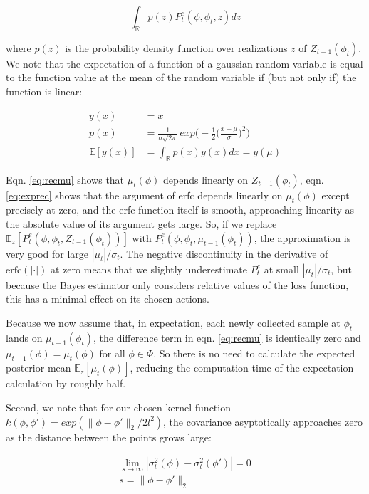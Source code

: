 \documentclass[letterpaper, 10 pt, conference]{ieeeconf}
\begin{document}
\begin{equation}
    \int_\mathbb{R}p(z)P_t^e(\phi,\phi_t,z)dz
\end{equation}
\smallskip

where $p(z)$ is the probability density function over realizations $z$ of $Z_{t-1}(\phi_t)$. We note that the expectation of a function of a gaussian random variable is equal to the function value at the mean of the random variable if (but not only if) the function is linear:

\begin{align}
    y(x)&=x \nonumber \\
    p(x)&= \frac{1}{\sigma \sqrt{2\pi}}\,exp\Big(-\frac{1}{2}\big(\frac{x-\mu}{\sigma}\big)^2\Big)\nonumber \\
    \mathbb{E}[y(x)]& = \int_\mathbb{R}p(x)y(x)dx = y(\mu)
\end{align}
\smallskip

Eqn. \ref{eq:recmu} shows that $\mu_t(\phi)$ depends linearly on $Z_{t-1}(\phi_t)$, eqn. \ref{eq:exprec} shows that the argument of erfc depends linearly on $\mu_t(\phi)$ except precisely at zero, and the erfc function itself is smooth, approaching linearity as the absolute value of its argument gets large. So, if we replace $\mathbb{E}_{z}[P_t^e(\phi,\phi_t,Z_{t-1}(\phi_t))]$ with $P_t^e(\phi,\phi_t,\mu_{t-1}(\phi_t))$, the approximation is very good for large $|\mu_t|/\sigma_t$. The negative discontinuity in the derivative of $\text{erfc}(|\cdot|)$ at zero means that we slightly underestimate $P_t^e$ at small $|\mu_t|/\sigma_t$, but because the Bayes estimator only considers relative values of the loss function, this has a minimal effect on its chosen actions.

Because we now assume that, in expectation, each newly collected sample at $\phi_t$ lands on $\mu_{t-1}(\phi_t)$, the difference term in eqn. \ref{eq:recmu} is identically zero and $\mu_{t-1}(\phi)=\mu_t(\phi)$ for all $\phi\in\Phi$. So there is no need to calculate the expected posterior mean $\mathbb{E}_z[\mu_t(\phi)]$, reducing the computation time of the expectation calculation by roughly half.

Second, we note that for our chosen kernel function $k(\phi,\phi')=exp(\|\phi-\phi'\|_2/2l^2)$, the covariance asyptotically approaches zero as the distance between the points grows large:

\begin{align}
    \lim_{s\rightarrow\infty} |\sigma_t^2(\phi)-\sigma_t^2(\phi')|=0 \\
    s = \|\phi-\phi'\|_2 \nonumber
\end{align}
\end{document}
